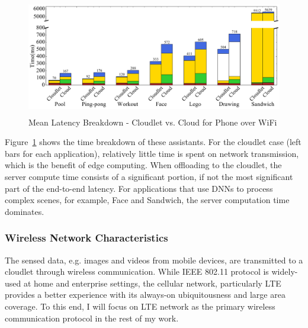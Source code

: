 \begin{figure}
        \centering
    \begin{minipage}{5.3in}
        \includegraphics[height = 2in]{FIGS/pool-pingpong-workout-face-lego-draw-cooking-breakdown.pdf}
    \end{minipage}
    \hspace{-0.50in}
    \begin{minipage}{0.7in}
    \end{minipage}
    \vspace{-0.1in}
	\caption{Mean Latency Breakdown - Cloudlet vs. Cloud for Phone over WiFi}
    \vspace{-0.0in}
    \label{fig:breakdown}
\end{figure}


Figure~\ref{fig:breakdown} shows the time breakdown of these assistants. For the
cloudlet case (left bars for each application), relatively little time is spent
on network transmission, which is the benefit of edge computing. When offloading
to the cloudlet, the server compute time consists of a significant portion, if
not the most significant part of the end-to-end latency. For applications
that use DNNs to process complex scenes, for example, Face and Sandwich, the
server computation time dominates.

\subsubsection{Wireless Network Characteristics}
The sensed data, e.g. images and videos from mobile devices, are transmitted to
a cloudlet through wireless communication. While IEEE 802.11 protocol is
widely-used at home and enterprise settings, the cellular network, particularly
LTE provides a better experience with its always-on ubiquitousness and large
area coverage. To this end, I will focus on LTE network as the primary wireless
communication protocol in the rest of my work.

